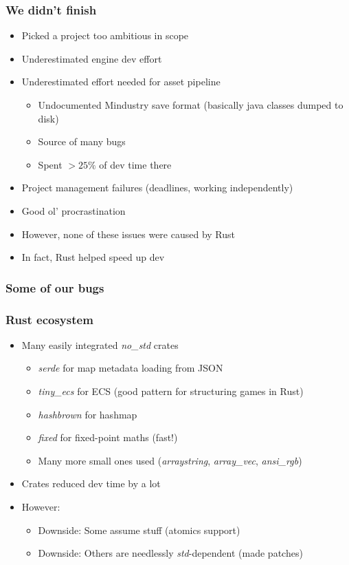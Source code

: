 \documentclass{beamer}
\begin{document}
\begin{frame}
	\frametitle{We didn't finish}
	\begin{itemize}
		\item Picked a project too ambitious in scope
		\item Underestimated engine dev effort
		\item Underestimated effort needed for asset pipeline \begin{itemize}
			      \item Undocumented Mindustry save format (basically java classes dumped to disk)
			      \item Source of many bugs
			      \item Spent $>25\%$ of dev time there
		      \end{itemize}
		\item Project management failures (deadlines, working independently)
		\item Good ol' procrastination
		\item However, none of these issues were caused by Rust
		\item In fact, Rust helped speed up dev
	\end{itemize}
\end{frame}

\begin{frame}
	\frametitle{Some of our bugs}
	\begin{itemize}
	\end{itemize}
\end{frame}


\begin{frame}
	\frametitle{Rust ecosystem}
	\begin{itemize}
		\item Many easily integrated \emph{no\_std} crates
		      \begin{itemize}
			      \item \emph{serde} for map metadata loading from JSON
			      \item \emph{tiny\_ecs} for ECS (good pattern for structuring games in Rust)
			      \item \emph{hashbrown} for hashmap
			      \item \emph{fixed} for fixed-point maths (fast!)
			      \item Many more small ones used (\emph{arraystring}, \emph{array\_vec}, \emph{ansi\_rgb})
		      \end{itemize}
		\item Crates reduced dev time by a lot
		\item However: \begin{itemize}
			      \item Downside: Some assume stuff (atomics support)
			      \item Downside: Others are needlessly \emph{std}-dependent (made patches)
		      \end{itemize}

	\end{itemize}
\end{frame}
\end{document}
